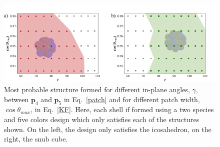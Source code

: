 \documentclass[a4paper, amsfonts, amssymb, amsmath, reprint, showkeys, nofootinbib, oneside]{revtex4-1}
\begin{document}









\begin{figure}[t]
	\includegraphics{fig6.pdf}
	\caption{\label{Sol} Most probable structure formed for different in-plane angles, $\gamma$, between $\textbf{p}_4$ and $\textbf{p}_5$ in Eq.~\ref{patch} and for different patch width, $\cos\theta_{max}$, in Eq.~\ref{KF}. Here, each shell if formed using a two species and five colors design which only satisfies each of the structures shown. On the left, the design only satisfies the icosahedron, on the right, the snub cube.}
\end{figure}
\end{document}
